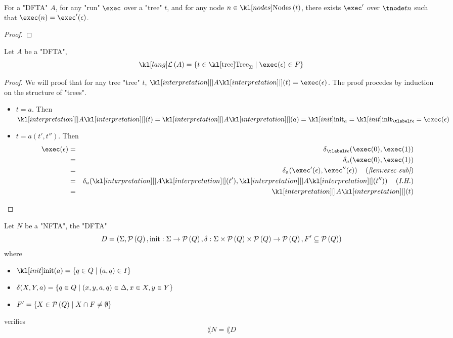 \documentclass{article}
\begin{document}
\begin{lemma}\label{lem:exec-sub}
	For a "DFTA" $A$, for any "run" $\exec$ over a "tree" $t$, and for any node $n \in \nodes t$, there exists $\exec'$ over
	$\tnode t n$ such that $\exec (n) = \exec'(\epsilon)$.
\end{lemma}

\begin{proof}
	\todo{}
\end{proof}

\begin{lemma}
	Let $A$ be a "DFTA",
	\[ \lang A = \setdef {t \in \tree_{\Sigma}} {\exec (\epsilon) \in F} \]
\end{lemma}

\begin{proof}
	We will proof that for any tree  "tree" $t$, $\interpret A (t) = \exec (\epsilon)$.
	The proof procedes by induction on the structure of "trees".
	\begin{itemize}
		\item $t = a$. Then
		      $\interpret A (t) = \interpret A (a)=  \init_a = \init_{\tlabel t {\epsilon}} = \exec (\epsilon)$
		\item $t = a(t',t'')$. Then
		      \begin{eqnarray*}
			      \exec (\epsilon)  &=& \delta_{\tlabel t {\epsilon}}(\exec (0), \exec (1)) \\
			      &=& \delta_a (\exec (0), \exec (1)) \\
			      &=& \delta_a (\exec' (\epsilon), \exec''  (\epsilon))  \reason{\ref{lem:exec-sub}}\\
			      &=& \delta_a (\interpret A (t'), \interpret A (t'')) \reason{I.H.}\\
			      &=& \interpret A (t)
		      \end{eqnarray*}
	\end{itemize}
\end{proof}

\begin{theorem}
	Let $N$ be a "NFTA", the "DFTA"
	\[ D = (\Sigma, \mathcal{P}\left(Q\right), \text{init} : \Sigma \to \mathcal{P}\left(Q\right), \delta : \Sigma \times \mathcal{P}\left(Q\right) \times \mathcal{P}\left(Q\right) \to \mathcal{P}\left(Q\right), F' \subseteq \mathcal{P}\left(Q\right)) \]
	where
	\begin{itemize}
		\item $\init (a) = \setdef {q \in Q} {(a,q) \in I}$
		\item $\delta ( X, Y, a) = \left\{q \in  Q \mid (x,y,a,q) \in \Delta, x \in X, y \in Y\right\}$
		\item $F' = \left\{X \in \mathcal{P}\left(Q\right) \mid X \cap F \neq \emptyset\right\}$
	\end{itemize}
	verifies
	\[ \lang N = \lang D \]
\end{theorem}
\end{document}
